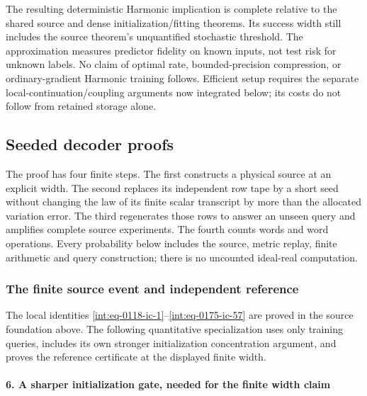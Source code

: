 
The resulting deterministic Harmonic implication is complete relative to the shared source and dense initialization/fitting theorems. Its success width still includes the source theorem's unquantified stochastic threshold. The approximation measures predictor fidelity on known inputs, not test risk for unknown labels. No claim of optimal rate, bounded-precision compression, or ordinary-gradient Harmonic training follows. Efficient setup requires the separate local-continuation/coupling arguments now integrated below; its costs do not follow from retained storage alone.


\subsection{Seeded decoder proofs}
\label{int:seeded-decoder-proofs}


The proof has four finite steps. The first constructs a physical source at an explicit width. The second replaces its independent row tape by a short seed without changing the law of its finite scalar transcript by more than the allocated variation error. The third regenerates those rows to answer an unseen query and amplifies complete source experiments. The fourth counts words and word operations. Every probability below includes the source, metric replay, finite arithmetic and query construction; there is no uncounted ideal-real computation.


\subsubsection{The finite source event and independent reference}
\label{int:decoder-finite-source}


The local identities \eqref{int:eq-0118-ic-1}--\allowbreak \eqref{int:eq-0175-ic-57} are proved in the source foundation above. The following quantitative specialization uses only training queries, includes its own stronger initialization concentration argument, and proves the reference certificate at the displayed finite width.


\paragraph{6. A sharper initialization gate, needed for the finite width claim}

